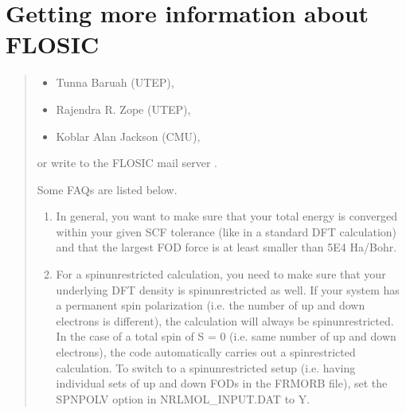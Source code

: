 \documentclass[letterpaper,10pt,english,openany,oneside]{sphinxmanual}
\begin{document}
\chapter{Getting more information about FLOSIC}
\label{\detokenize{docs/nrlmolfaq:getting-more-information-about-flosic}}\label{\detokenize{docs/nrlmolfaq:nrlmolfaq}}\label{\detokenize{docs/nrlmolfaq::doc}}\begin{quote}
\begin{description}
\begin{itemize}
\item {} 
\sphinxAtStartPar
Tunna Baruah        (UTEP), 

\item {} 
\sphinxAtStartPar
Rajendra R. Zope    (UTEP), 

\item {} 
\sphinxAtStartPar
Koblar Alan Jackson (CMU), 

\end{itemize}

\end{description}

\sphinxAtStartPar
or write to the FLOSIC mail server .

\sphinxAtStartPar
Some FAQs are listed below.
\begin{enumerate}
%
\item {} \begin{description}
\sphinxAtStartPar
In general, you want to make sure that your total energy is converged within your given SCF tolerance (like in a standard DFT calculation) and
that the largest FOD force is at least smaller than 5E\sphinxhyphen{}4 Ha/Bohr.

\end{description}

\item {} \begin{description}
\sphinxAtStartPar
For a spin\sphinxhyphen{}unrestricted calculation, you need to make sure that your underlying DFT density is spin\sphinxhyphen{}unrestricted as well.
If your system has a permanent spin polarization (i.e. the number of up and down electrons is different), the calculation
will always be spin\sphinxhyphen{}unrestricted.
In the case of a total spin of S = 0 (i.e. same number of up and down electrons), the code automatically carries out
a spin\sphinxhyphen{}restricted calculation. To switch to a spin\sphinxhyphen{}unrestricted setup (i.e. having individual sets of up and down FODs in the FRMORB file), set the
SPNPOLV option in NRLMOL\_INPUT.DAT to Y.


\end{description}
\end{enumerate}
\end{quote}
\end{document}
